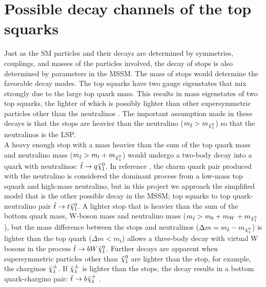 \section{Possible decay channels of the top squarks} 
\label{sec:stopDecay}
Just as the SM particles and their decays are determined by symmetries, couplings, and masses of the particles involved, the decay of stops is also determined by parameters in the MSSM. The mass of stops would determine the favorable decay modes. The top squarks have two gauge eigenstates that mix strongly due to the large top quark mass. This results in mass eigenstates of two top squarks, the lighter of which is possibly lighter than other supersymmetric particles other than the neutralinos \cite{thomson2013modern, boehm2000decays}. The important assumption made in these decays is that the stops are heavier than the neutralino ($m_{\Tilde{t}} > m_{\Tilde{\chi}_1^0} $) so that the neutralinos is the LSP. \\

A heavy enough stop with a mass heavier than the sum of the top quark mass and neutralino mass ($m_{\Tilde{t}} > m_t+m_{\Tilde{\chi}_1^0}$) would undergo a two-body decay into a quark with neutralinos: $\Tilde{t}\rightarrow q\Tilde{\chi}_1^0$. In reference \cite{boehm2000decays}, the charm quark pair produced with the neutralino is considered the dominant process from a low-mass top squark and high-mass neutralino, but in this project we approach the simplified model that is the other possible decay in the MSSM; top squarks to top quark-neutralino pair $\Tilde{t}\rightarrow t\Tilde{\chi}_1^0$. A lighter stop that is heavier than the sum of the bottom quark mass, W-boson mass and neutralino mass ($m_{\Tilde{t}} > m_b + m_W + m_{\Tilde{\chi}_1^0}$), but the mass difference between the stops and neutralinos ($\Delta m = m_{\Tilde{t}} - m_{\Tilde{\chi}_1^0} $) is lighter than the top quark ($\Delta m < m_t$) allows a three-body decay with virtual W bosons in the process $\Tilde{t}\rightarrow b W \Tilde{\chi}_1^0$. Further decays are apparent when supersymmetric particles other than $\Tilde{\chi}_1^0 $ are lighter than the stop, for example, the charginos $\Tilde{\chi}_1^{\pm}$. If $\Tilde{\chi}_1^{\pm}$ is lighter than the stops, the decay results in a bottom quark-chargino pair: $\Tilde{t}\rightarrow b\Tilde{\chi}_1^+$ \cite{boehm2000decays}. \\


